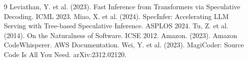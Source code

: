 \documentclass[11pt,a4paper]{article}
\begin{document}
\begin{thebibliography}{9}
 Leviathan, Y. et al. (2023). Fast Inference from Transformers via Speculative Decoding. ICML 2023.
 Miao, X. et al. (2024). SpecInfer: Accelerating LLM Serving with Tree-based Speculative Inference. ASPLOS 2024.
 Tu, Z. et al. (2014). On the Naturalness of Software. ICSE 2012.
 Amazon. (2023). Amazon CodeWhisperer. AWS Documentation.
 Wei, Y. et al. (2023). MagiCoder: Source Code Is All You Need. arXiv:2312.02120.
\end{thebibliography}
\end{document}

